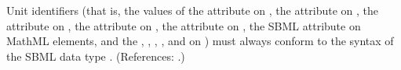 Unit identifiers (that is, the values of the  attribute on
\UnitDefinition, the  attribute on \Compartment, the
 attribute on \Parameter, the  attribute on \LocalParameter, the  attribute
on \Species, the SBML  attribute on MathML 
elements, and the , ,
, ,  and
 on \Model) must always conform to the syntax of the
SBML data type .  (References: .)
